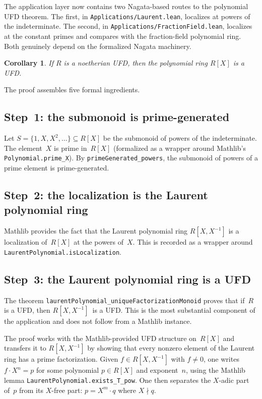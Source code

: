 \documentclass[11pt]{article}
\theoremstyle{plain}
\newtheorem{corollary}[theorem]{Corollary}
\theoremstyle{definition}
\theoremstyle{remark}
\newcommand{\li}[1]{\texorpdfstring{\texttt{#1}}{#1}}
\newcommand{\lf}[1]{\texorpdfstring{\nolinkurl{#1}}{#1}}
\begin{document}
The application layer now contains two Nagata-based routes to the polynomial
UFD theorem.  The first, in \lf{Applications/Laurent.lean}, localizes at powers
of the indeterminate.  The second, in \lf{Applications/FractionField.lean},
localizes at the constant primes and compares with the fraction-field
polynomial ring.  Both genuinely depend on the formalized Nagata machinery.

\begin{corollary}\label{cor:poly}
If $R$ is a noetherian UFD, then the polynomial ring $R[X]$ is a UFD.
\end{corollary}

\noindent
The proof assembles five formal ingredients.

\subsection{Step~1: the submonoid is prime-generated}

Let $S=\{1,X,X^2,\ldots\}\subseteq R[X]$ be the submonoid of powers of the
indeterminate.  The element~$X$ is prime in~$R[X]$ (formalized as a wrapper
around Mathlib's \li{Polynomial.prime\_X}).  By
\li{primeGenerated\_powers}, the submonoid of powers of a prime element is
prime-generated.

\subsection{Step~2: the localization is the Laurent polynomial ring}

Mathlib provides the fact that the Laurent polynomial ring $R[X,X^{-1}]$
is a localization of~$R[X]$ at the powers of~$X$.  This is recorded as a
wrapper around \li{LaurentPolynomial.isLocalization}.

\subsection{Step~3: the Laurent polynomial ring is a UFD}

The theorem \li{laurentPolynomial\_uniqueFactorizationMonoid} proves that
if~$R$ is a UFD, then $R[X,X^{-1}]$~is a UFD.  This is the most substantial
component of the application and does not follow from a Mathlib instance.

The proof works with the Mathlib-provided UFD structure on~$R[X]$ and
transfers it to $R[X,X^{-1}]$ by showing that every nonzero element of the
Laurent ring has a prime factorization.  Given $f\in R[X,X^{-1}]$ with
$f\ne 0$, one writes $f\cdot X^n = p$ for some polynomial $p\in R[X]$ and
exponent~$n$, using the Mathlib lemma \li{LaurentPolynomial.exists\_T\_pow}.
One then separates the $X$-adic part of~$p$ from its $X$-free part:
$p=X^m\cdot q$ where $X\nmid q$.
\end{document}
